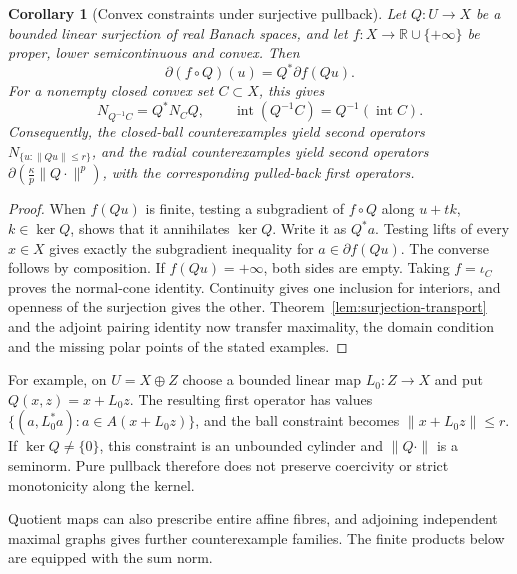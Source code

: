 \documentclass[11pt]{article}
\newcommand{\R}{\mathbb R}
\newtheorem{corollary}{Corollary}
\theoremstyle{definition}
\theoremstyle{remark}
\begin{document}
\begin{corollary}[Convex constraints under surjective pullback]
\label{cor:pullback-constraints}
Let $Q:U\to X$ be a bounded linear surjection of real Banach spaces, and let $f:X\to\R\cup\{+\infty\}$ be proper, lower semicontinuous and convex. Then
\begin{equation}
\partial(f\circ Q)(u)=Q^*\partial f(Qu).
\label{eq:pullback-subgradient}
\end{equation}
For a nonempty closed convex set $C\subset X$, this gives
\[
N_{Q^{-1}C}=Q^*N_CQ,
\qquad
\operatorname{int}(Q^{-1}C)=Q^{-1}(\operatorname{int}C).
\]
Consequently, the closed-ball counterexamples yield second operators $N_{\{u:\|Qu\|\le r\}}$, and the radial counterexamples yield second operators $\partial(\frac\kappa p\|Q\cdot\|^p)$, with the corresponding pulled-back first operators.
\end{corollary}
\begin{proof}
When $f(Qu)$ is finite, testing a subgradient of $f\circ Q$ along $u+tk$, $k\in\ker Q$, shows that it annihilates $\ker Q$. Write it as $Q^*a$. Testing lifts of every $x\in X$ gives exactly the subgradient inequality for $a\in\partial f(Qu)$. The converse follows by composition. If $f(Qu)=+\infty$, both sides are empty. Taking $f=\iota_C$ proves the normal-cone identity. Continuity gives one inclusion for interiors, and openness of the surjection gives the other. Theorem~\ref{lem:surjection-transport} and the adjoint pairing identity now transfer maximality, the domain condition and the missing polar points of the stated examples.
\end{proof}

For example, on $U=X\oplus Z$ choose a bounded linear map $L_0:Z\to X$ and put $Q(x,z)=x+L_0z$. The resulting first operator has values $\{(a,L_0^*a):a\in A(x+L_0z)\}$, and the ball constraint becomes $\|x+L_0z\|\le r$. If $\ker Q\ne\{0\}$, this constraint is an unbounded cylinder and $\|Q\cdot\|$ is a seminorm. Pure pullback therefore does not preserve coercivity or strict monotonicity along the kernel.

Quotient maps can also prescribe entire affine fibres, and adjoining independent maximal graphs gives further counterexample families. The finite products below are equipped with the sum norm.
\end{document}
